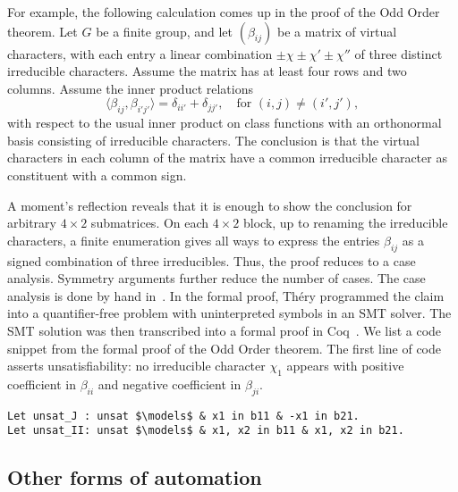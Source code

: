 \documentclass[brochure,english,12pt]{bourbaki}
\theoremstyle{plain}
\begin{document}
For example, the following calculation comes up in the proof of the
Odd Order theorem.  Let $G$ be a finite group, and let $(\beta_{ij})$
be a matrix of virtual characters, with each entry a linear
combination $\pm \chi \pm \chi' \pm \chi''$ of three distinct irreducible
characters.  Assume the matrix has at least four rows and two columns.
Assume the inner product relations
\[
\langle \beta_{ij},\beta_{i'j'}\rangle = \delta_{ii'} + \delta_{jj'},\quad \text{for } (i,j)\ne (i',j'),
\]
with respect to the usual inner product on class functions with an orthonormal basis consisting
of irreducible characters.  
The conclusion is that  the virtual characters in each column of the matrix have a common irreducible character as constituent
with a common sign.

A moment's reflection reveals that it is enough to show the conclusion
for arbitrary $4\times 2$ submatrices.  On each $4\times 2$ block, up
to renaming the irreducible characters, a finite enumeration gives all
ways to express the entries $\beta_{ij}$ as a signed combination of
three irreducibles.  Thus, the proof reduces to a case analysis.
Symmetry arguments further reduce the number of cases.  The case
analysis is done by hand in~\cite{peterfalvi2000character}.  In the
formal proof, Th\'ery programmed the claim into a quantifier-free
problem with uninterpreted symbols in an SMT solver.  The SMT solution
was then transcribed into a formal proof in
Coq~\cite{gonthier2013machine}.  We list a code snippet from the
formal proof of the Odd Order theorem.  
The first line of code asserts unsatisfiability:  no irreducible character
$\chi_1$ appears with positive coefficient in $\beta_{ii}$ and
negative coefficient in $\beta_{ji}$.


\begin{lstlisting}[keepspaces=true,stringstyle=\tt,basicstyle=\small,frame=single,framesep=8pt,mathescape,morekeywords={Let},columns=flexible]
Let unsat_J : unsat $\models$ & x1 in b11 & -x1 in b21.
Let unsat_II: unsat $\models$ & x1, x2 in b11 & x1, x2 in b21.
\end{lstlisting}






\subsection{Other forms of automation}
\end{document}
